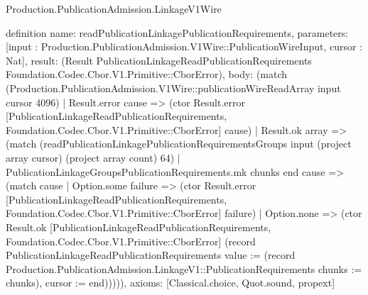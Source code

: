 \begin{lexlean}{Production.PublicationAdmission.LinkageV1Wire}
\begin{semanticmodule}
definition{
  name: readPublicationLinkagePublicationRequirements,
  parameters: [input : Production.PublicationAdmission.V1Wire::PublicationWireInput, cursor : Nat],
  result: (Result PublicationLinkageReadPublicationRequirements Foundation.Codec.Cbor.V1.Primitive::CborError),
  body: (match (Production.PublicationAdmission.V1Wire::publicationWireReadArray input cursor 4096)
    | Result.error cause => (ctor Result.error [PublicationLinkageReadPublicationRequirements, Foundation.Codec.Cbor.V1.Primitive::CborError] cause)
    | Result.ok array => (match (readPublicationLinkagePublicationRequirementsGroups input (project array cursor) (project array count) 64)
      | PublicationLinkageGroupsPublicationRequirements.mk chunks end cause => (match cause
        | Option.some failure => (ctor Result.error [PublicationLinkageReadPublicationRequirements, Foundation.Codec.Cbor.V1.Primitive::CborError] failure)
        | Option.none => (ctor Result.ok [PublicationLinkageReadPublicationRequirements, Foundation.Codec.Cbor.V1.Primitive::CborError] (record PublicationLinkageReadPublicationRequirements {value := (record Production.PublicationAdmission.LinkageV1::PublicationRequirements {chunks := chunks}), cursor := end}))))),
  axioms: [Classical.choice, Quot.sound, propext]
}


\end{semanticmodule}
\end{lexlean}
